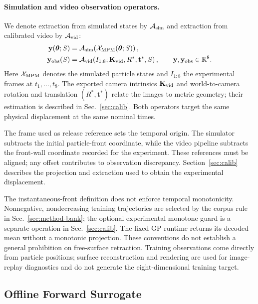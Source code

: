 \paragraph{Simulation and video observation operators.}
We denote extraction from simulated states by $\mathcal{A}_{\rm sim}$
and extraction from calibrated video by $\mathcal{A}_{\rm vid}$:
\begin{equation}
\label{eq:shared-observation}
\begin{aligned}
  \mathbf{y}(\boldsymbol{\theta};S)
  &=\mathcal{A}_{\rm sim}
    \!\left(\mathcal{X}_{\rm MPM}(\boldsymbol{\theta};S)\right),\\
  \mathbf{y}_{\rm obs}(S)
  &=\mathcal{A}_{\rm vid}
    \!\left(I_{1:8};\mathbf{K}_{\rm vid},R^{*},\mathbf{t}^{*},S\right),
  \qquad \mathbf{y},\mathbf{y}_{\rm obs}\in\mathbb{R}^{8}.
\end{aligned}
\end{equation}
Here $\mathcal{X}_{\rm MPM}$ denotes the simulated particle states and
$I_{1:8}$ the experimental frames at $t_1,\ldots,t_8$. The exported
camera intrinsics $\mathbf K_{\rm vid}$ and world-to-camera rotation and
translation $(R^*,\mathbf t^*)$ relate the images to metric geometry;
their estimation is described in Sec.~\ref{sec:calib}. Both operators
target the same physical displacement at the same nominal times.

The frame used as release reference sets the temporal origin. The
simulator subtracts the initial particle-front coordinate, while the
video pipeline subtracts the front-wall coordinate recorded for the
experiment. These references must be aligned; any offset contributes
to observation discrepancy. Section~\ref{sec:calib} describes the
projection and extraction used to obtain the experimental displacement.

The instantaneous-front definition does not enforce temporal
monotonicity. Nonnegative, nondecreasing training trajectories are
selected by the corpus rule in Sec.~\ref{sec:method-bank}; the optional experimental monotone guard is a separate operation in
Sec.~\ref{sec:calib}. The fixed GP runtime returns its decoded mean
without a monotonic projection.
These conventions do not establish a general prohibition on free-surface
retraction. Training observations come directly from particle positions;
surface reconstruction and rendering are used for image-replay
diagnostics and do not generate the eight-dimensional training target.

\subsection{Offline Forward Surrogate}
\label{sec:surrogate}

